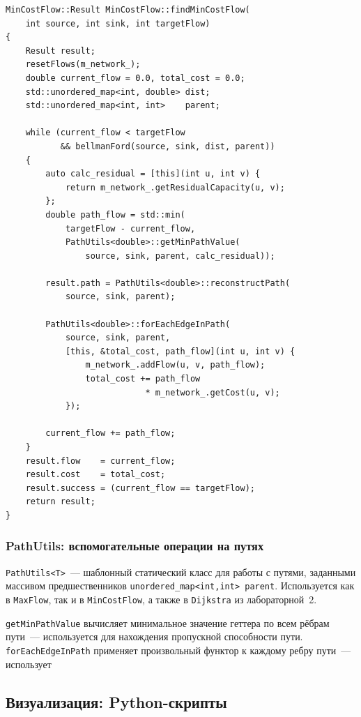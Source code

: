 \begin{lstlisting}[style=cppstyle, caption={Поток минимальной стоимости (MinCostFlow.cc)}]
MinCostFlow::Result MinCostFlow::findMinCostFlow(
    int source, int sink, int targetFlow)
{
    Result result;
    resetFlows(m_network_);
    double current_flow = 0.0, total_cost = 0.0;
    std::unordered_map<int, double> dist;
    std::unordered_map<int, int>    parent;

    while (current_flow < targetFlow
           && bellmanFord(source, sink, dist, parent))
    {
        auto calc_residual = [this](int u, int v) {
            return m_network_.getResidualCapacity(u, v);
        };
        double path_flow = std::min(
            targetFlow - current_flow,
            PathUtils<double>::getMinPathValue(
                source, sink, parent, calc_residual));

        result.path = PathUtils<double>::reconstructPath(
            source, sink, parent);

        PathUtils<double>::forEachEdgeInPath(
            source, sink, parent,
            [this, &total_cost, path_flow](int u, int v) {
                m_network_.addFlow(u, v, path_flow);
                total_cost += path_flow
                            * m_network_.getCost(u, v);
            });

        current_flow += path_flow;
    }
    result.flow    = current_flow;
    result.cost    = total_cost;
    result.success = (current_flow == targetFlow);
    return result;
}
\end{lstlisting}

\subsubsection{PathUtils: вспомогательные операции на путях}

\texttt{PathUtils<T>}~--- шаблонный статический класс для работы
с путями, заданными массивом предшественников
\texttt{unordered\_map<int,int> parent}. Используется как в
\texttt{MaxFlow}, так и в \texttt{MinCostFlow}, а также в
\texttt{Dijkstra} из лабораторной~2.

\texttt{getMinPathValue} вычисляет минимальное значение геттера
по всем рёбрам пути~--- используется для нахождения
пропускной способности пути. \texttt{forEachEdgeInPath} применяет
произвольный функтор к каждому ребру пути~--- использует

\subsection{Визуализация: Python-скрипты}

